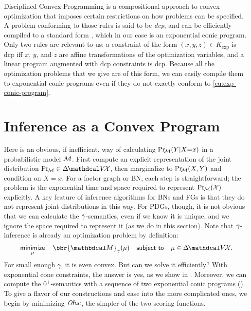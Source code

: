 Disciplined Convex Programming \parencite{dcp-thesis} is a
compositional approach to convex optimization that 
imposes certain restrictions on how problems can be specified.
A problem conforming to those rules is said to be \emph{dcp},
and can be efficiently compiled to a standard form
\parencite{agrawal2018rewriting},
which in our case is an exponential conic program.
Only two rules are relevant to us: a constraint of the form
$(x,y,z) \in K_{\exp}$ is
    dcp iff $x$, $y$, and $z$ are affine transformations of the
    optimization variables, 
and a linear program
augmented
with dcp 
constraints is dcp.
Because all the optimization problems that we give are
of this form,
we can easily compile them
to exponential conic programs even if they do not exactly conform to \eqref{eq:exp-conic-program}.


\section{Inference as a Convex Program}
    \label{sec:inf-as-cvx-program}

Here is an obvious, if inefficient,
way
of calculating
$\Pr_{\!\cal M}(Y|X{=}x)$ in a
probabilistic model $\cal M$. 
First compute an explicit representation of the joint distribution 
$\Pr_{\!\cal M} \in \Delta\mskip-2mu\V\!\X$, 
then marginalize to 
$\Pr_{\!\cal M}(X,Y)$ and condition on $X{=}x$.
For a factor graph or BN,
each step is
straightforward;
the problem is the exponential time and space required to represent $\Pr_{\!\cal M}(\mathcal X)$ explicitly.
A key feature of inference algorithms for BNs and FGs is that they
do not represent joint distributions in this way.
For PDGs, though, it is not
obvious that
we can calculate the $\zogamma$-semantics,
even if
we know it is unique, and
we ignore the space required to represent it (as we do in this section).
Note that $\zogamma$-inference is already an optimization problem by definition:
\[
    \minimize_\mu\quad
        \bbr{\dg M}_\gamma(\mu)
    \quad \subjto\quad \mu \in \Delta\mskip-2mu\V\mskip-2mu\X.
\]
For small enough 
 $\gamma$,
it is even convex.
But can we solve it efficiently?
With exponential cone constraints,
the answer is yes, as we show in .
Moreover, we can compute the $0^+$\!-semantics with a sequence of two exponential conic programs ().
To give a flavor of our constructions and ease into
the more complicated ones, we begin by 
minimizing
 $\mathit{O\mskip-2.5muI\mskip-3.5mun\mskip-1.7muc}$, the simpler of the two scoring functions.




